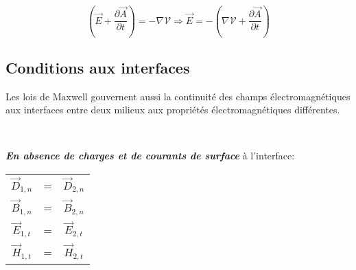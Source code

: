 \[(\vec{E} + \frac{\partial \vec{A}}{\partial t}) = - \nabla \mathcal{V} \Rightarrow \vec{E} = - (\nabla \mathcal{V} + \frac{\partial \vec{A}}{\partial t}) \]
 
 \subsection{Conditions aux interfaces}
 
 Les lois de Maxwell gouvernent aussi la continuité des champs électromagnétiques aux interfaces entre deux milieux aux propriétés électromagnétiques différentes. \\
 
 \begin{marginfigure}[-10cm]\\
 	\normalsize 
 	\label{interface1}
 	\caption{\textit{\textbf{En absence de charges et de courants de surface}} à l'interface: }
	\begin{center}
	
	\begin{tabular}{|ccc|}
		
		\hline
		
		$\vec{D}_{1,n} $ & = & $\vec{D}_{2,n} $ \\ 
		
		$\vec{B}_{1,n} $ & = & $\vec{B}_{2,n} $ \\ 
		
		$\vec{E}_{1,t} $ & = & $\vec{E}_{2,t} $ \\ 
		
		$\vec{H}_{1,t} $ & = & $\vec{H}_{2,t} $ \\ 
		
		\hline
		
	\end{tabular}
	
	
	
	
	\end{center}

 \end{marginfigure}
 
